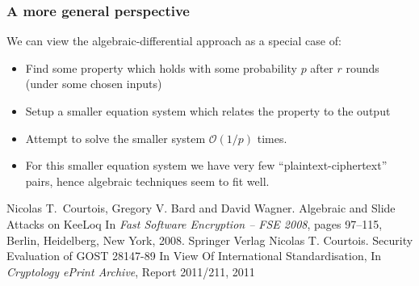 \documentclass[9pt]{beamer}
\begin{document}
\begin{frame}
\frametitle{A more general perspective}

We can view the algebraic-differential approach as a special case of:

\begin{itemize}
 \item Find some property which holds with some probability $p$ after $r$ rounds (under some chosen inputs)
 \item Setup a smaller equation system which relates the  property to the output
 \item Attempt to solve the smaller system $\mathcal{O}(1/p)$ times.
 \item For this smaller equation system we have very few ``plaintext-ciphertext'' pairs, hence algebraic techniques seem to fit well.
\end{itemize}

\begin{small}
\begin{thebibliography}{keeloq}
 Nicolas T.\ Courtois, Gregory V. Bard and David Wagner.
 \newblock Algebraic and Slide Attacks on KeeLoq
 \newblock In {\em Fast Software Encryption -- FSE 2008},
 pages  97--115, Berlin, Heidelberg, New York, 2008. Springer Verlag 
 Nicolas T. Courtois.
 \newblock Security Evaluation of GOST 28147-89 In View Of International Standardisation,
 \newblock In {\em Cryptology ePrint Archive}, Report 2011/211, 2011
\end{thebibliography}
\end{small}
\end{frame}
\end{document}
